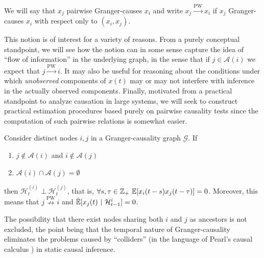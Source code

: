 \documentclass[12pt]{article}
\def\pwgc{\overset{\text{PW}}{\rightarrow}}  %
\def\npwgc{\overset{\text{PW}}{\nrightarrow}}  %
\def\gcg{\mathcal{G}}  %
\def\H{\mathcal{H}}  %
\newcommand{\linE}[2]{\hat{\E}[#1\ |\ #2]}  %
\newcommand{\anc}[1]{\mathcal{A}(#1)}  %
\begin{document}
\begin{definition}
  We will say that $x_j$ pairwise Granger-causes $x_i$ and write
  $x_j \pwgc x_i$ if $x_j$ Granger-causes $x_i$ with respect only to
  $(x_i, x_j)$.
\end{definition}

This notion is of interest for a variety of reasons.  From a purely
conceptual standpoint, we will see how the notion can in some sense
capture the idea of ``flow of information'' in the underlying graph,
in the sense that if $j \in \anc{i}$ we expect that $j \pwgc i$.  It
may also be useful for reasoning about the conditions under which
\textit{unobserved} components of $x(t)$ may or may not interfere with
inference in the actually observed components.  Finally, motivated
from a practical standpoint to analyze causation in large systems, we
will seek to construct practical estimation procedures based purely on
pairwise causality tests since the computation of such pairwise
relations is somewhat easier.

\begin{lemma}
  \label{lem:separated_ancestor_uncorrelated}
  Consider distinct nodes $i, j$ in a Granger-causality graph
  $\gcg$.  If

  \begin{enumerate}[label=(\alph*)]
    \item{$j \not\in \anc{i}$ and $i \not\in \anc{j}$}
    \item{$\anc{i}\cap\anc{j} = \emptyset$}
  \end{enumerate}

  then $\H_t^{(i)} \perp \H_t^{(j)}$, that is,
  $\forall s, \tau \in \mathbb{Z}_+\ \mathbb{E}[x_i(t - s)x_j(t - \tau)] = 0$.  Moreover,
  this means that $j \npwgc i$ and $\linE{x_j(t)}{\H_{t - 1}^i} = 0$.
\end{lemma}

\begin{remark}
  The possibility that there exist nodes sharing both $i$ and $j$ as
  ancestors is not excluded, the point being that the temporal nature
  of Granger-causality eliminates the problems caused by ``colliders''
  (in the language of Pearl's causal calculus
  \cite{pearl2009causality}) in static causal inference.
\end{remark}
\end{document}
